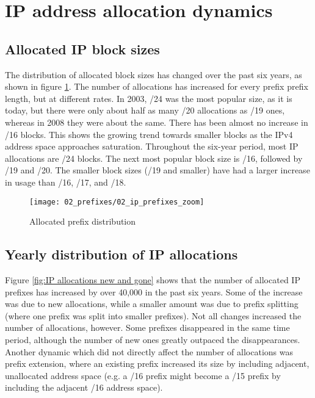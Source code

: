 \section{IP address allocation dynamics}
\label{sec:allocations}

\subsection{Allocated IP block sizes}

The distribution of allocated block sizes has changed over the past six years,
as shown in figure \ref{fig:IP allocations}. The number of allocations has
increased for every prefix prefix length, but at different rates. In 2003, /24
was the most popular size, as it is today, but there were only about half as
many /20 allocations as /19 ones, whereas in 2008 they were about the same.
There has been almost no increase in /16 blocks. This shows the growing trend
towards smaller blocks as the IPv4 address space approaches saturation.
Throughout the six-year period, most IP allocations are /24 blocks. The next
most popular block size is /16, followed by /19 and /20. The smaller block
sizes (/19 and smaller) have had a larger increase in usage than /16, /17, and
/18.

\begin{figure}[htbp]
 	\centering
 		\texttt{[image: 02\_prefixes/02\_ip\_prefixes\_zoom]}
	\caption{Allocated prefix distribution}
 	\label{fig:IP allocations}
\end{figure}

\subsection{Yearly distribution of IP allocations}


Figure \ref{fig:IP allocations new and gone} shows that the number of
allocated IP prefixes has increased by over 40,000 in the past six years. Some
of the increase was due to new allocations, while a smaller amount was due to
prefix splitting (where one prefix was split into smaller prefixes). Not all
changes increased the number of allocations, however. Some prefixes
disappeared in the same time period, although the number of new ones greatly
outpaced the disappearances. Another dynamic which did not directly affect the
number of allocations was prefix extension, where an existing prefix increased
its size by including adjacent, unallocated address space (e.g. a /16 prefix
might become a /15 prefix by including the adjacent /16 address space).

